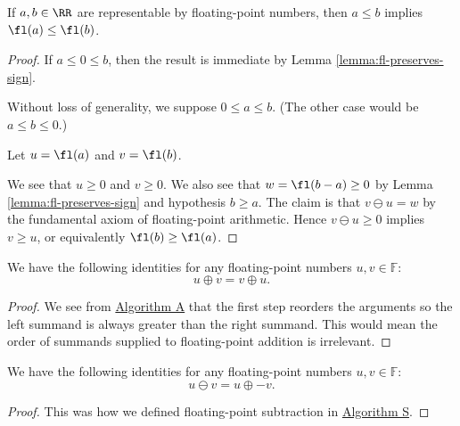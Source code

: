 \begin{lemma}
  If $a,b\in\RR$ are representable by floating-point numbers, then
  $a\leq b$ implies $\fl(a)\leq\fl(b)$.
\end{lemma}
\begin{proof}
  If $a\leq 0\leq b$, then the result is immediate by Lemma \ref{lemma:fl-preserves-sign}.

  Without loss of generality, we suppose $0\leq a\leq b$. (The other
  case would be $a\leq b\leq 0$.)

  Let $u=\fl(a)$ and $v=\fl(b)$.

  We see that $u\geq0$ and $v\geq 0$. We also see that $w=\fl(b-a)\geq0$
  by Lemma \ref{lemma:fl-preserves-sign} and hypothesis $b\geq a$.
  The claim is that $v\ominus u=w$ by the fundamental axiom of
  floating-point arithmetic. Hence $v\ominus u\geq0$ implies $v\geq u$,
  or equivalently $\fl(b)\geq\fl(a)$.
\end{proof}
\begin{thm}
  We have the following identities for any floating-point numbers
  $u,v\in\mathbb{F}$:
  \begin{equation*}
    u\oplus v = v\oplus u.
  \end{equation*}
\end{thm}
\begin{proof}
  We see from \hyperref[alg:float-addition]{Algorithm A} that the first
  step reorders the arguments so the left summand is always greater than
  the right summand. This would mean the order of summands supplied to
  floating-point addition is irrelevant.
\end{proof}

\begin{thm}
  We have the following identities for any floating-point numbers
  $u,v\in\mathbb{F}$:
  \begin{equation*}
    u\ominus v = u \oplus -v.
  \end{equation*}
\end{thm}
\begin{proof}
This was how we defined floating-point subtraction in
\hyperref[alg:float-subtraction]{Algorithm S}.
\end{proof}

